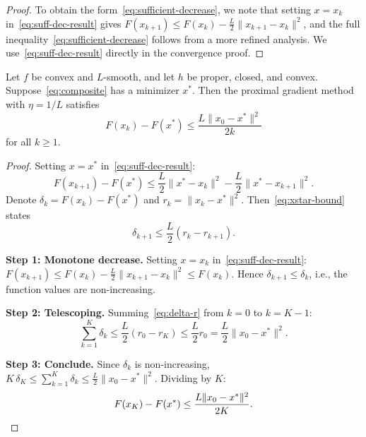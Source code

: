 \documentclass[11pt,a4paper]{article}
\begin{document}
\begin{proof}
To obtain the form~\eqref{eq:sufficient-decrease}, we note that
setting $x = x_k$ in~\eqref{eq:suff-dec-result} gives
$F(x_{k+1}) \le F(x_k) - \frac{L}{2}\|x_{k+1} - x_k\|^2$, and the
full inequality~\eqref{eq:sufficient-decrease} follows from a more
refined analysis. We use~\eqref{eq:suff-dec-result} directly in the
convergence proof.
\end{proof}

\begin{theorem}%
\label{thm:prox-grad-convergence}
Let $f$ be convex and $L$-smooth, and let $h$ be proper, closed, and
convex. Suppose~\eqref{eq:composite} has a minimizer $x^*$. Then the
proximal gradient method with $\eta = 1/L$ satisfies
\begin{equation}\label{eq:prox-grad-rate}
  F(x_k) - F(x^*) \le \frac{L\|x_0 - x^*\|^2}{2k}
\end{equation}
for all $k \ge 1$.
\end{theorem}

\begin{proof}
Setting $x = x^*$ in~\eqref{eq:suff-dec-result}:
\begin{equation}\label{eq:xstar-bound}
  F(x_{k+1}) - F(x^*) \le \frac{L}{2}\|x^* - x_k\|^2
  - \frac{L}{2}\|x^* - x_{k+1}\|^2.
\end{equation}
Denote $\delta_k = F(x_k) - F(x^*)$ and
$r_k = \|x_k - x^*\|^2$. Then~\eqref{eq:xstar-bound} states
\begin{equation}\label{eq:delta-r}
  \delta_{k+1} \le \frac{L}{2}(r_k - r_{k+1}).
\end{equation}

\textbf{Step 1: Monotone decrease.}
Setting $x = x_k$ in~\eqref{eq:suff-dec-result}:
$F(x_{k+1}) \le F(x_k) - \frac{L}{2}\|x_{k+1} - x_k\|^2 \le F(x_k)$.
Hence $\delta_{k+1} \le \delta_k$, i.e., the function values are
non-increasing.

\textbf{Step 2: Telescoping.}
Summing~\eqref{eq:delta-r} from $k = 0$ to $k = K - 1$:
\begin{equation}\label{eq:telescope}
  \sum_{k=1}^{K} \delta_k \le \frac{L}{2}(r_0 - r_K)
  \le \frac{L}{2}r_0 = \frac{L}{2}\|x_0 - x^*\|^2.
\end{equation}

\textbf{Step 3: Conclude.}
Since $\delta_k$ is non-increasing, $K\,\delta_K \le \sum_{k=1}^K
\delta_k \le \frac{L}{2}\|x_0 - x^*\|^2$. Dividing by $K$:
\begin{equation}\label{eq:prox-grad-final}
  F(x_K) - F(x^*) \le \frac{L\|x_0 - x^*\|^2}{2K}. \qedhere
\end{equation}
\end{proof}
\end{document}
